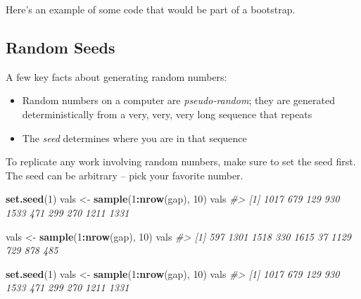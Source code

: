 \documentclass[]{book}
\newenvironment{Shaded}{\begin{snugshade}}{\end{snugshade}}
\newcommand{\CommentTok}[1]{\textcolor[rgb]{0.56,0.35,0.01}{\textit{#1}}}
\newcommand{\DataTypeTok}[1]{\textcolor[rgb]{0.13,0.29,0.53}{#1}}
\newcommand{\DecValTok}[1]{\textcolor[rgb]{0.00,0.00,0.81}{#1}}
\newcommand{\KeywordTok}[1]{\textcolor[rgb]{0.13,0.29,0.53}{\textbf{#1}}}
\newcommand{\NormalTok}[1]{#1}
\newcommand{\OperatorTok}[1]{\textcolor[rgb]{0.81,0.36,0.00}{\textbf{#1}}}
\newcommand{\OtherTok}[1]{\textcolor[rgb]{0.56,0.35,0.01}{#1}}
\newcommand{\StringTok}[1]{\textcolor[rgb]{0.31,0.60,0.02}{#1}}
\providecommand{\tightlist}{%
  \setlength{\itemsep}{0pt}\setlength{\parskip}{0pt}}
\begin{document}
Here's an example of some code that would be part of a bootstrap.

\begin{Shaded}
\end{Shaded}

\hypertarget{random-seeds}{%
\subsection{Random Seeds}\label{random-seeds}}

A few key facts about generating random numbers:

\begin{itemize}
\tightlist
\item
  Random numbers on a computer are \emph{pseudo-random}; they are generated deterministically from a very, very, very long sequence that repeats
\item
  The \emph{seed} determines where you are in that sequence
\end{itemize}

To replicate any work involving random numbers, make sure to set the seed first. The seed can be arbitrary -- pick your favorite number.

\begin{Shaded}
\begin{Highlighting}[]
\KeywordTok{set.seed}\NormalTok{(}\DecValTok{1}\NormalTok{)}
\NormalTok{vals <-}\StringTok{ }\KeywordTok{sample}\NormalTok{(}\DecValTok{1}\OperatorTok{:}\KeywordTok{nrow}\NormalTok{(gap), }\DecValTok{10}\NormalTok{)}
\NormalTok{vals}
\CommentTok{#>  [1] 1017  679  129  930 1533  471  299  270 1211 1331}

\NormalTok{vals <-}\StringTok{ }\KeywordTok{sample}\NormalTok{(}\DecValTok{1}\OperatorTok{:}\KeywordTok{nrow}\NormalTok{(gap), }\DecValTok{10}\NormalTok{)}
\NormalTok{vals}
\CommentTok{#>  [1]  597 1301 1518  330 1615   37 1129  729  878  485}

\KeywordTok{set.seed}\NormalTok{(}\DecValTok{1}\NormalTok{)}
\NormalTok{vals <-}\StringTok{ }\KeywordTok{sample}\NormalTok{(}\DecValTok{1}\OperatorTok{:}\KeywordTok{nrow}\NormalTok{(gap), }\DecValTok{10}\NormalTok{)}
\NormalTok{vals}
\CommentTok{#>  [1] 1017  679  129  930 1533  471  299  270 1211 1331}
\end{Highlighting}
\end{Shaded}
\end{document}
